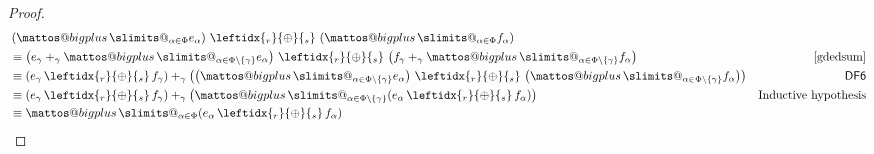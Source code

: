 \documentclass[a4paper,UKenglish,cleveref, autoref, thm-restate]{lipics-v2021}
\makeatletter
\newcommand{\WC}[2]{\,\leftidx{_{#1}}{{\oplus}}{_{#2}}\,}
\newcommand{\Ax}[1]{\ensuremath{\mathsf{#1}}}
\theoremstyle{plain}\newtheoremrep{thm}{Theorem}[section]
\newcommand{\bigplus}{\DOTSB\mathop{\mathpalette\mattos@bigplus\relax}\slimits@
}
\newcommand\mattos@bigplus[2]{\vcenter{\hbox{\sbox\z@{$#1\sum$}\resizebox{!}{0.9\dimexpr\ht\z@+\dp\z@}{\raisebox{\depth}{$\m@th#1+$}}}}\vphantom{\sum}}
\makeatother
\begin{document}
\begin{toappendix}
\begin{proof}
			\begin{align*}
				&\left(\bigplus_{\alpha \in \Phi}e_\alpha\right) \WC{r}{s} \left(\bigplus_{\alpha \in \Phi}f_\alpha\right) \\&\equiv \left(e_\gamma +_\gamma \bigplus_{\alpha \in \Phi\setminus\{\gamma\}}e_\alpha\right) \WC{r}{s} \left(f_\gamma +_\gamma \bigplus_{\alpha \in \Phi\setminus\{\gamma\}}f_\alpha\right)&\cref{gdedsum}\\
				&\equiv \left(e_\gamma \WC{r}{s} f_\gamma\right) +_\gamma \left(\left(\bigplus_{\alpha \in \Phi\setminus\{\gamma\}}e_\alpha\right) \WC{r}{s} \left(\bigplus_{\alpha \in \Phi\setminus\{\gamma\}}f_\alpha\right)\right)&\Ax{DF6}\\
				&\equiv \left(e_\gamma \WC{r}{s} f_\gamma\right) +_\gamma \left(\bigplus_{\alpha \in \Phi\setminus\{\gamma\}}(e_\alpha \WC{r}{s} f_\alpha)\right)&\text{Inductive hypothesis}\\
				&\equiv \bigplus_{\alpha \in \Phi}(e_\alpha \WC{r}{s} f_\alpha)&\rlap{\qedhere} 
			\end{align*}
		\end{proof}
	\end{toappendix}
		
\end{document}
